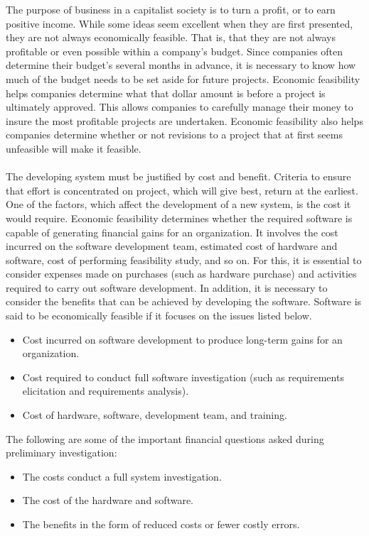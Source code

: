 The purpose of business in a capitalist society is to turn a profit, or to earn positive income. While some ideas seem excellent when they are first presented, they are not always economically feasible. That is, that they are not always profitable or even possible within a company's budget. Since companies often determine their budget's several months in advance, it is necessary to know how much of the budget needs to be set aside for future projects. Economic feasibility helps companies determine what that dollar amount is before a project is ultimately approved. This allows companies to carefully manage their money to insure the most profitable projects are undertaken. Economic feasibility also helps companies determine whether or not revisions to a project that at first seems unfeasible will make it feasible.\\\\

The developing system must be justified by cost and benefit. Criteria to ensure that effort is concentrated on project, which will give best, return at the earliest. One of the factors, which affect the development of a new system, is the cost it would require. Economic feasibility determines whether the required software is capable of generating financial gains for an organization. It involves the cost incurred on the software development team, estimated cost of hardware and software, cost of performing feasibility study, and so on. For this, it is essential to consider expenses made on purchases (such as hardware purchase) and activities required to carry out software development. In addition, it is necessary to consider the benefits that can be achieved by developing the software. Software is said to be economically feasible if it focuses on the issues listed below.
\begin{itemize}
	\item Cost incurred on software development to produce long-term gains for an organization.
	\item Cost required to conduct full software investigation (such as requirements elicitation and requirements analysis).
	\item Cost of hardware, software, development team, and training.
\end{itemize}

The following are some of the important financial questions asked during preliminary investigation:
\begin{itemize}
	\item The costs conduct a full system investigation.
	\item The cost of the hardware and software.
	\item The benefits in the form of reduced costs or fewer costly errors.
\end{itemize}

